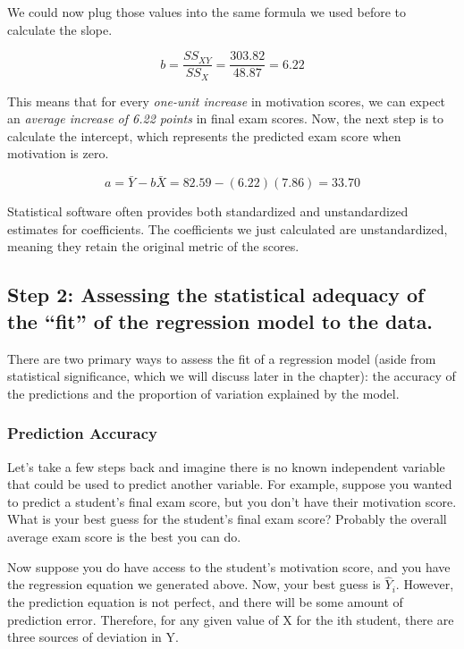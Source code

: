 \documentclass[
  letterpaper,
  DIV=11,
  numbers=noendperiod]{scrreprt}
\begin{document}
We could now plug those values into the same formula we used before to
calculate the slope.

\[
b = \frac{SS_{XY}}{SS_X} = \frac{303.82}{48.87} = 6.22
\]

This means that for every \emph{one-unit increase} in motivation scores,
we can expect an \emph{average increase of 6.22 points} in final exam
scores. Now, the next step is to calculate the intercept, which
represents the predicted exam score when motivation is zero.

\[
a = \bar{Y} - b\bar{X} = 82.59 - (6.22)(7.86) = 33.70
\]

Statistical software often provides both standardized and unstandardized
estimates for coefficients. The coefficients we just calculated are
unstandardized, meaning they retain the original metric of the scores.

\subsection*{Step 2: Assessing the statistical adequacy of the ``fit''
of the regression model to the
data.}\label{step-2-assessing-the-statistical-adequacy-of-the-fit-of-the-regression-model-to-the-data.}

There are two primary ways to assess the fit of a regression model
(aside from statistical significance, which we will discuss later in the
chapter): the accuracy of the predictions and the proportion of
variation explained by the model.

\subsubsection*{Prediction Accuracy}\label{prediction-accuracy}

Let's take a few steps back and imagine there is no known independent
variable that could be used to predict another variable. For example,
suppose you wanted to predict a student's final exam score, but you
don't have their motivation score. What is your best guess for the
student's final exam score? Probably the overall average exam score is
the best you can do.

Now suppose you do have access to the student's motivation score, and
you have the regression equation we generated above. Now, your best
guess is \(\hat{Y}_i\). However, the prediction equation is not perfect,
and there will be some amount of prediction error. Therefore, for any
given value of X for the ith student, there are three sources of
deviation in Y.
\end{document}
